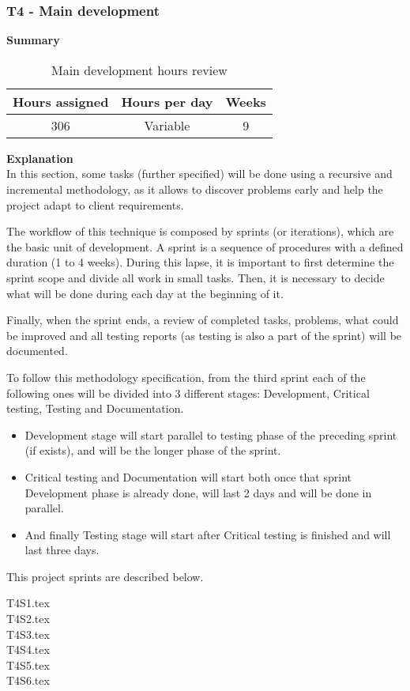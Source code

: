\subsubsection{T4 - Main development}
\label{sssec:mainDev}

\textbf{Summary}
\begin{table}[ht]
\centering
  \begin{tabular}{| c | c | c |}
  \hline Hours assigned & Hours per day & Weeks \\ \hline  
  306  & Variable & 9        \\ \hline
  \end{tabular}
  \caption{Main development hours review} \vspace{3pt}
  \label{tab:mainDev}
\end{table}

\par{\textbf{Explanation}}\\
In this section, some tasks (further specified) will be done using a recursive and incremental methodology, as it allows to discover problems early and help the project adapt to client requirements.

The workflow of this technique is composed by sprints (or iterations), which are the basic unit of development. A sprint is a sequence of procedures with a defined duration (1 to 4 weeks). During this lapse, it is important to first determine the sprint scope and divide all work in small tasks. Then, it is necessary to decide what will be done during each day at the beginning of it.

Finally, when the sprint ends, a review of completed tasks, problems, what could be improved and all testing reports (as testing is also a part of the sprint) will be documented.

To follow this methodology specification, from the third sprint each of the following ones will be divided into 3 different stages: Development, Critical testing, Testing and Documentation. 
\begin{itemize}
\item Development stage will start parallel to testing phase of the preceding sprint (if exists), and will be the longer phase of the sprint.
\item Critical testing and Documentation will start both once that sprint Development phase is already done, will last 2 days and will be done in parallel.
\item And finally Testing stage will start after Critical testing is finished and will last three days. 
\end{itemize}

This project sprints are described below.

\pagebreak
{T4S1.tex}\\


{T4S2.tex}\\


{T4S3.tex}\\

\pagebreak
{T4S4.tex}\\


{T4S5.tex}\\


{T4S6.tex}